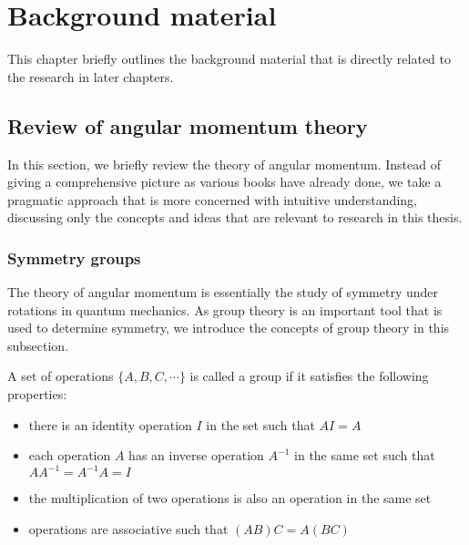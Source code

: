 
\chapter{Background material}
\label{ch:background}
This chapter  briefly outlines the background material that is directly related to the research in later chapters.


\section{Review of angular momentum theory}
\label{sec:reviewAngularMomentum}

In this section, we briefly review the theory of angular momentum. Instead of giving a comprehensive 
picture as various books\cite{edmonds-book, rose-book, brink-book, zare-book, silver-book, kleinman-book, Varshalovich-book, sakurai-book, RotSpect} have already done, we take a pragmatic approach that is more concerned with intuitive 
understanding, discussing only the concepts and ideas that are relevant to research in this thesis. 

\subsection{Symmetry groups}  
\label{sec:groupTheory}

The theory of angular momentum is essentially the study of symmetry under rotations in quantum mechanics. 
As group theory is an important tool that is used to determine symmetry, we introduce the concepts of group theory
 in this subsection.

A set of operations $\{ A, B, C, \cdots \}$ is called a group if it satisfies the following properties:
\begin{itemize}
\item there is an identity operation $I$ in the set such that $A I = A$
\item  each operation $A$ has an inverse operation $A^{-1}$ in the same set such that $A A^{-1}= A^{-1} A = I$
\item  the multiplication of two operations is also an operation in the same set
\item  operations are associative such that $(AB)C = A(BC)$
\end{itemize}

